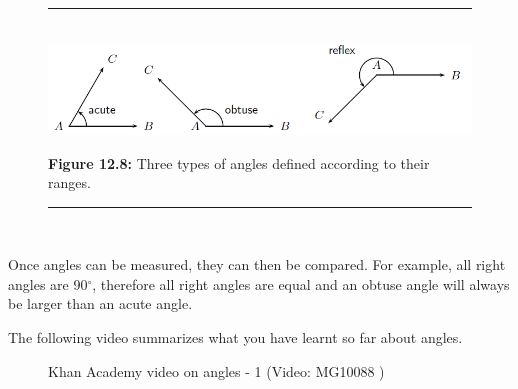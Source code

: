         
    \setcounter{subfigure}{0}


	\begin{figure}[H] %
    \begin{center}
    \rule[.1in]{\figurerulewidth}{.005in} \\
        \label{m39370*uid25!!!underscore!!!media}\label{m39370*uid25!!!underscore!!!printimage}\includegraphics[width=.8\columnwidth]{col11306.imgs/m39370_MG10C13_008.png} %
        
      \vspace{2pt}
    \vspace{\rubberspace}\par \begin{cnxcaption}
	  \small \textbf{Figure 12.8: }Three types of angles defined according to their ranges.
	\end{cnxcaption}
      
    \vspace{.1in}
    \rule[.1in]{\figurerulewidth}{.005in} \\
        
    \end{center}

 \end{figure}   

    \addtocounter{footnote}{-0}
    
        \label{m39370*id315245}Once angles can be measured, they can then be compared. For example, all right angles are 90\begin{math}{}^{\circ }\end{math}, therefore all right angles are equal and an obtuse angle will always be larger than an acute angle.\par \label{m39370*eip-752}The following video summarizes what you have learnt so far about angles.


    \setcounter{subfigure}{0}


	\begin{figure}[H] %
    
    
    \textnormal{Khan Academy video on angles - 1}\vspace{.1in} \nopagebreak
  \label{m39370*yt-media1}\label{m39370*yt-video1}
             { (Video:  MG10088 )}
      
      \vspace{2pt}
    \vspace{.1in}
    
    

 \end{figure}   

